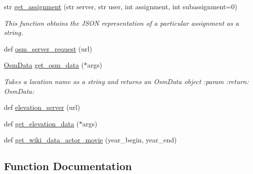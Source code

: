 \begin{DoxyCompactItemize}
str \mbox{\hyperlink{namespacebridges_1_1data__src__dependent_1_1data__source_ada4137e0574e7f4875f83cf4afdc74d5}{get\+\_\+assignment}} (str server, str user, int assignment, int subassignment=0)
\begin{DoxyCompactList}\small\item\em This function obtains the J\+S\+ON representation of a particular assignment as a string. \end{DoxyCompactList}\item 
def \mbox{\hyperlink{namespacebridges_1_1data__src__dependent_1_1data__source_a5644517c9ee0f5ab9e59a4f4d64fa038}{osm\+\_\+server\+\_\+request}} (url)
\item 
\mbox{\hyperlink{classbridges_1_1data__src__dependent_1_1osm_1_1_osm_data}{Osm\+Data}} \mbox{\hyperlink{namespacebridges_1_1data__src__dependent_1_1data__source_ae33c7ed8751b98e913b4485c0b124ed3}{get\+\_\+osm\+\_\+data}} ($\ast$args)
\begin{DoxyCompactList}\small\item\em Takes a location name as a string and returns an Osm\+Data object \+:param \+:return\+: Osm\+Data\+: \end{DoxyCompactList}\item 
def \mbox{\hyperlink{namespacebridges_1_1data__src__dependent_1_1data__source_a5232b70889e93385e68a7cd1b296123e}{elevation\+\_\+server}} (url)
\item 
def \mbox{\hyperlink{namespacebridges_1_1data__src__dependent_1_1data__source_ac6662947ed387a2304495eb53914bba3}{get\+\_\+elevation\+\_\+data}} ($\ast$args)
\item 
def \mbox{\hyperlink{namespacebridges_1_1data__src__dependent_1_1data__source_a15db0d52db8b6e096db60f99b2f0171d}{get\+\_\+wiki\+\_\+data\+\_\+actor\+\_\+movie}} (year\+\_\+begin, year\+\_\+end)
\end{DoxyCompactItemize}


\subsection{Function Documentation}
\mbox{\label{namespacebridges_1_1data__src__dependent_1_1data__source_a5232b70889e93385e68a7cd1b296123e}} 
